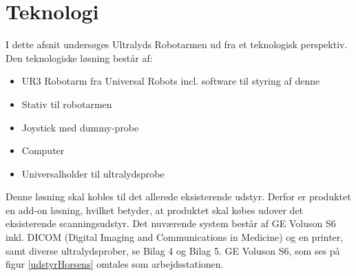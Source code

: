 \chapter{Teknologi} \label{Teknologi}
I dette afsnit undersøges Ultralyds Robotarmen ud fra et teknologisk perspektiv.  \\
Den teknologiske løsning består af:
\begin{itemize}
\item UR3 Robotarm fra Universal Robots incl. software til styring af denne
\item Stativ til robotarmen
\item Joystick med dummy-probe
\item Computer
\item Universalholder til ultralydsprobe
\end{itemize}
Denne løsning skal kobles til det allerede eksisterende udstyr. Derfor er produktet en add-on løsning, hvilket betyder, at produktet skal købes udover det eksisterende scanningsudstyr. Det nuværende system består af GE Voluson S6 inkl. DICOM (Digital Imaging and Communications in Medicine) og en printer, samt diverse ultralydsprober, se Bilag 4 og Bilag 5. GE Voluson S6, som ses på figur \ref{udstyrHorsens} omtales som arbejdsstationen. 

